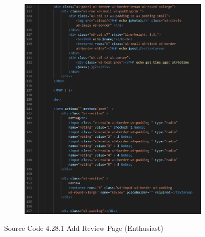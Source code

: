 \begin{enumerate}[1.]
\begin{figure}[h]
\begin{subfigure}[b]{0.7\textwidth}
            \label{fig:sub1}
        \end{subfigure}
        \hspace{0.04\textwidth}
        \begin{subfigure}[b]{0.7\textwidth}
            \centering
            \includegraphics[width=\textwidth]{mainmatter/images/frontend/code/eaddreview2.png}
            \label{fig:sub2}
        \end{subfigure}
        \caption*{Source Code 4.28.1 Add Review Page (Enthusiast)}
        \label{fig:myfig67a}
    \end{figure}
    \clearpage
    \begin{figure}[h]\ContinuedFloat
        \centering
        \begin{subfigure}[b]{0.9\textwidth}
            \centering

\end{subfigure}
\end{figure}
\end{enumerate}
